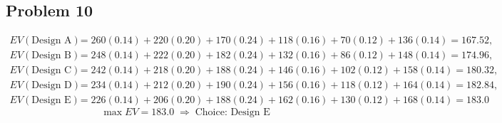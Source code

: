 	\subsection*{Problem 10}
	\[
	\begin{aligned}
	EV(\text{Design A}) &= 260(0.14)+220(0.20)+170(0.24)+118(0.16)+70(0.12)+136(0.14)=167.52,\\
	EV(\text{Design B}) &= 248(0.14)+222(0.20)+182(0.24)+132(0.16)+86(0.12)+148(0.14)=174.96,\\
	EV(\text{Design C}) &= 242(0.14)+218(0.20)+188(0.24)+146(0.16)+102(0.12)+158(0.14)=180.32,\\
	EV(\text{Design D}) &= 234(0.14)+212(0.20)+190(0.24)+156(0.16)+118(0.12)+164(0.14)=182.84,\\
	EV(\text{Design E}) &= 226(0.14)+206(0.20)+188(0.24)+162(0.16)+130(0.12)+168(0.14)=183.0
	\end{aligned}
	\]
	\[
	\max EV = 183.0 \;\Rightarrow\; \text{Choice: Design E}
	\]


